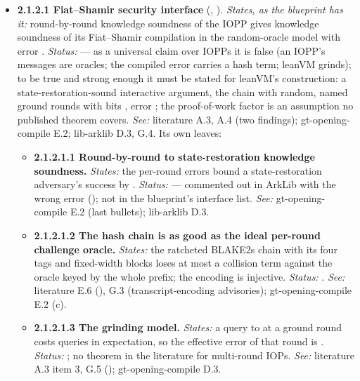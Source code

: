 \begin{itemize}[label={}, leftmargin=1.3em, itemindent=-1.3em, labelwidth=0pt, labelsep=0pt, itemsep=4pt, topsep=3pt]
\begin{itemize}[label={}, leftmargin=1.3em, itemindent=-1.3em, labelwidth=0pt, labelsep=0pt, itemsep=4pt, topsep=3pt]
\item {}\label{obl:node-2.1.2.1}\oblflag\textbf{2.1.2.1 Fiat–Shamir security interface} (, ). \emph{States, as the blueprint has it:} round-by-round knowledge soundness of the IOPP gives knowledge soundness of its Fiat–Shamir compilation in the random-oracle model with error . \emph{Status:}   — as a universal claim over IOPPs it is false (an IOPP's messages are oracles; the compiled error carries a hash term; leanVM grinds); to be true and strong enough it must be stated for leanVM's construction: a state-restoration-sound interactive argument, the  chain with  random, named ground rounds with bits , error ; the proof-of-work factor is an assumption no published theorem covers. \emph{See:} literature A.3, A.4 (two findings); gt-opening-compile E.2; lib-arklib D.3, G.4. Its own leaves:
\begin{itemize}[label={}, leftmargin=1.3em, itemindent=-1.3em, labelwidth=0pt, labelsep=0pt, itemsep=4pt, topsep=3pt]
\item {}\label{obl:node-2.1.2.1.1}\oblflag\textbf{2.1.2.1.1 Round-by-round to state-restoration knowledge soundness.} \emph{States:} the per-round errors bound a state-restoration adversary's success by . \emph{Status:}   — commented out in ArkLib with the wrong error (); not in the blueprint's interface list. \emph{See:} gt-opening-compile E.2 (last bullets); lib-arklib D.3.
\item {}\label{obl:node-2.1.2.1.2}\oblflag\textbf{2.1.2.1.2 The hash chain is as good as the ideal per-round challenge oracle.} \emph{States:} the ratcheted BLAKE2s chain with its four tags and fixed-width blocks loses at most a collision term against the oracle keyed by the whole prefix; the encoding is injective. \emph{Status:}  . \emph{See:} literature E.6 (), G.3 (transcript-encoding advisories); gt-opening-compile E.2 (c).
\item {}\label{obl:node-2.1.2.1.3}\oblflag\textbf{2.1.2.1.3 The grinding model.} \emph{States:} a query to  at a ground round costs  queries in expectation, so the effective error of that round is . \emph{Status:}  ; no theorem in the literature for multi-round IOPs. \emph{See:} literature A.3 item 3, G.5 (); gt-opening-compile D.3.

\end{itemize}
\end{itemize}
\end{itemize}
